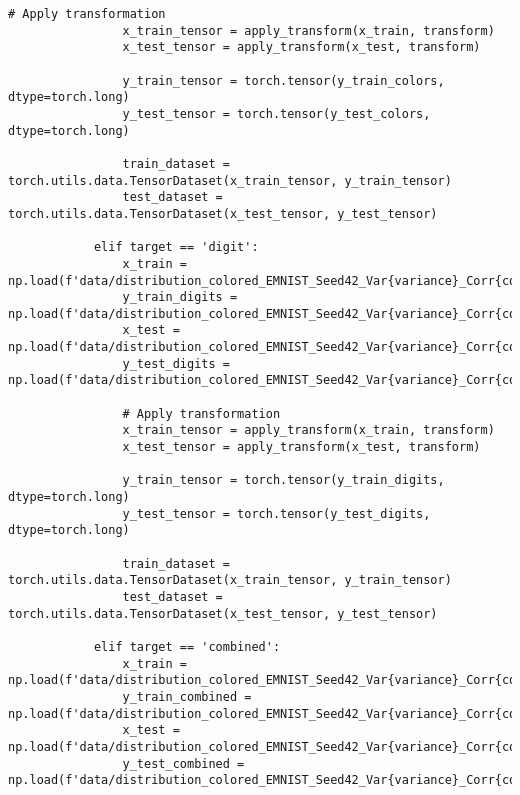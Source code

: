 \begin{lstlisting}[style=pythonstyle, caption={メインコード}]
                # Apply transformation
                x_train_tensor = apply_transform(x_train, transform)
                x_test_tensor = apply_transform(x_test, transform)
                
                y_train_tensor = torch.tensor(y_train_colors, dtype=torch.long)
                y_test_tensor = torch.tensor(y_test_colors, dtype=torch.long)
                
                train_dataset = torch.utils.data.TensorDataset(x_train_tensor, y_train_tensor)
                test_dataset = torch.utils.data.TensorDataset(x_test_tensor, y_test_tensor)
            
            elif target == 'digit':
                x_train = np.load(f'data/distribution_colored_EMNIST_Seed42_Var{variance}_Corr{correlation}/x_train_colored.npy')
                y_train_digits = np.load(f'data/distribution_colored_EMNIST_Seed42_Var{variance}_Corr{correlation}/y_train_digits.npy')
                x_test = np.load(f'data/distribution_colored_EMNIST_Seed42_Var{variance}_Corr{correlation}/x_test_colored.npy')
                y_test_digits = np.load(f'data/distribution_colored_EMNIST_Seed42_Var{variance}_Corr{correlation}/y_test_digits.npy')
                
                # Apply transformation
                x_train_tensor = apply_transform(x_train, transform)
                x_test_tensor = apply_transform(x_test, transform)
                
                y_train_tensor = torch.tensor(y_train_digits, dtype=torch.long)
                y_test_tensor = torch.tensor(y_test_digits, dtype=torch.long)
                
                train_dataset = torch.utils.data.TensorDataset(x_train_tensor, y_train_tensor)
                test_dataset = torch.utils.data.TensorDataset(x_test_tensor, y_test_tensor)
                
            elif target == 'combined':
                x_train = np.load(f'data/distribution_colored_EMNIST_Seed42_Var{variance}_Corr{correlation}/x_train_colored.npy')
                y_train_combined = np.load(f'data/distribution_colored_EMNIST_Seed42_Var{variance}_Corr{correlation}/y_train_combined.npy')
                x_test = np.load(f'data/distribution_colored_EMNIST_Seed42_Var{variance}_Corr{correlation}/x_test_colored.npy')
                y_test_combined = np.load(f'data/distribution_colored_EMNIST_Seed42_Var{variance}_Corr{correlation}/y_test_combined.npy')
                

\end{lstlisting}
